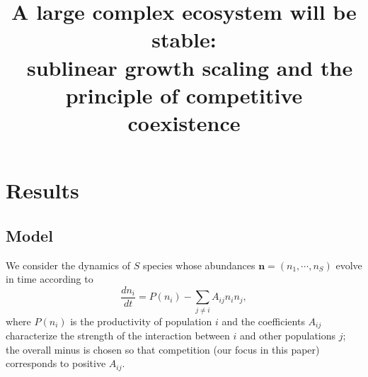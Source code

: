 \documentclass[12pt]{article}
\title{A large complex ecosystem will be stable:\\ sublinear growth scaling and the principle of competitive coexistence}
\begin{document}
\maketitle

\begin{abstract}
\end{abstract}


\section{Results}

\subsection{Model}

We consider the dynamics of $S$ species whose abundances $\mathbf{n} = (n_1, \cdots , n_S)$ evolve in time according to
\begin{equation}\label{model}
    \frac{dn_i}{dt} = P(n_i) - \sum_{j\neq i}A_{ij} n_i n_j,
\end{equation}
where $P(n_i)$ is the productivity of population $i$ and the coefficients $A_{ij}$ characterize the strength of the interaction between $i$ and other populations $j$; the overall minus is chosen so that competition (our focus in this paper) corresponds to positive $A_{ij}$. 
\end{document}
